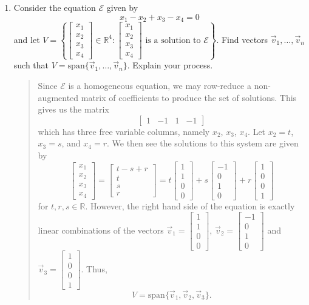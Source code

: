\documentclass[letter]{article}
\newcommand{\R}{\mathbb{R}}
\newcommand{\Span}{\mathrm{span}}
\newcommand{\mat}[1]{\begin{bmatrix}#1\end{bmatrix}}
\begin{document}
\begin{enumerate}
		\item Consider the equation $\mathcal E$ given by
			\[
				x_1-x_2+x_3-x_4=0
			\]
			and let $V=\left\{\mat{x_1\\x_2\\x_3\\x_4}\in \R^4:\mat{x_1\\x_2\\x_3\\x_4}\text{ is a solution to }\mathcal E\right\}$.
			Find vectors $\vec v_1,\ldots,\vec v_n$ such that $V=\Span\{\vec v_1,\ldots,\vec v_n\}$.  Explain your
			process.
			\begin{quote}
				Since $\mathcal E$ is a homogeneous equation, we may row-reduce a non-augmented
				matrix of coefficients to produce the set of solutions.  This gives us the matrix
				\[
					\mat{1&-1&1&-1}
				\]
				which has three free variable columns, namely $x_2$, $x_3$, $x_4$.  Let $x_2=t$, $x_3=s$, and $x_4=r$.
				We then see the solutions to this system are given by
				\[
					\mat{x_1\\x_2\\x_3\\x_4}=
					\mat{t-s+r\\t\\s\\r}=t\mat{1\\1\\0\\0}+s\mat{-1\\0\\1\\0}+r\mat{1\\0\\0\\1}
				\]
				for $t,r,s\in\R$.  However, the right hand side of the equation is exactly linear combinations
				of the vectors $\vec v_1=\mat{1\\1\\0\\0}$, $\vec v_2=\mat{-1\\0\\1\\0}$ and $\vec v_3=
				\mat{1\\0\\0\\1}$.  Thus,
				\[
					V=\Span\{\vec v_1,\vec v_2,\vec v_3\}.
				\]
			\end{quote}



	\end{enumerate}
\end{document}
